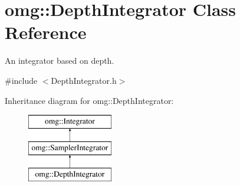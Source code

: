 \hypertarget{classomg_1_1_depth_integrator}{}\section{omg\+::Depth\+Integrator Class Reference}
\label{classomg_1_1_depth_integrator}


An integrator based on depth.  




{\ttfamily \#include $<$Depth\+Integrator.\+h$>$}

Inheritance diagram for omg\+::Depth\+Integrator\+:\begin{figure}[H]
\begin{center}
\leavevmode
\includegraphics[height=3.000000cm]{classomg_1_1_depth_integrator}
\end{center}
\end{figure}
